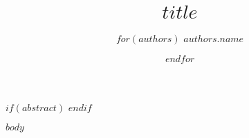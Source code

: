 \documentclass[graybox]{svmult}
\begin{document}
\title*{$title$}

\author{ $for(authors)$ $authors.name$ \and $endfor$ }

\maketitle

$if(abstract)$
$endif$


$body$




\end{document}
